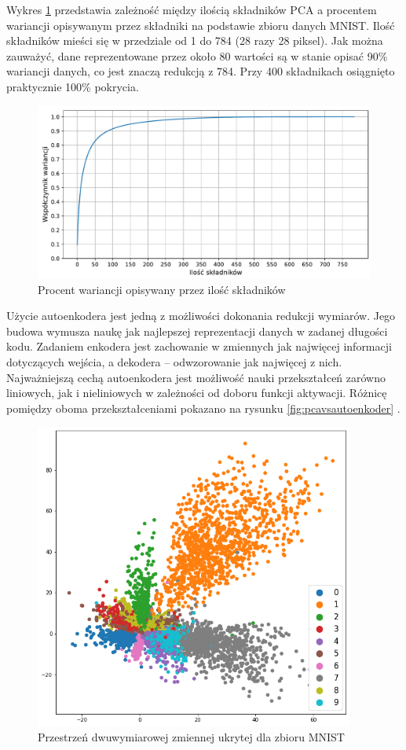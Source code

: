 \documentclass[a4paper,12pt,oneside]{book} %
\begin{document}
Wykres \ref{fig:pcacumsum} przedstawia zależność między ilością składników PCA a procentem wariancji opisywanym przez składniki na podstawie zbioru danych MNIST. Ilość składników mieści się w przedziale od 1 do 784 (28 razy 28 piksel). Jak można zauważyć, dane reprezentowane przez około 80 wartości są w stanie opisać 90\% wariancji danych, co jest znaczą redukcją z 784. Przy 400 składnikach osiągnięto praktycznie 100\% pokrycia. 
\begin{figure}[h!]
	\centering
	\includegraphics[width=\textwidth]{pcacumsum.pdf}
	\caption{Procent wariancji opisywany przez ilość składników}
	\label{fig:pcacumsum}
\end{figure}



Użycie autoenkodera jest jedną z możliwości dokonania redukcji wymiarów. Jego budowa wymusza naukę jak najlepszej reprezentacji danych w zadanej długości kodu. Zadaniem enkodera jest zachowanie w zmiennych jak najwięcej informacji dotyczących wejścia, a dekodera -- odwzorowanie jak najwięcej z nich. Najważniejszą cechą autoenkodera jest możliwość nauki przekształceń zarówno liniowych, jak i nieliniowych w zależności od doboru funkcji aktywacji. Różnicę pomiędzy oboma przekształceniami pokazano na rysunku \ref{fig:pcavsautoenkoder} \cite{nonlinearpca}.
\begin{figure}[h!]
	\centering
	\includegraphics[width=10.5cm]{pictures/aelatentspace.png}
	\caption{Przestrzeń dwuwymiarowej zmiennej ukrytej dla zbioru MNIST}
	\label{fig:latentspaceae}
\end{figure}
\end{document}

